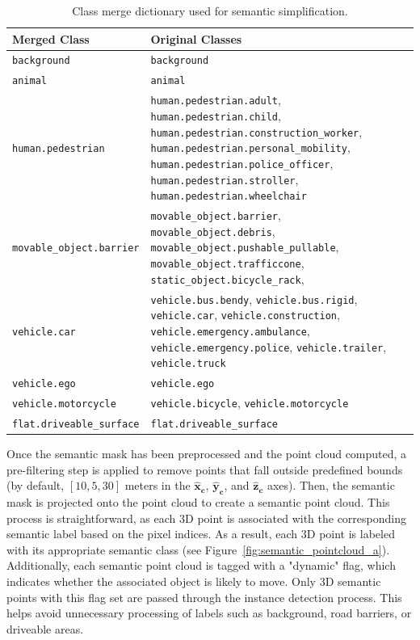 \begin{table}[h!]
    \centering
    \footnotesize
    \begin{tabular}{|l|p{10cm}|}
        \hline
        \textbf{Merged Class} & \textbf{Original Classes} \\
        \hline
        \texttt{background} & \texttt{background} \\ 
        \hline
        \texttt{animal} & \texttt{animal} \\
        \hline
        \texttt{human.pedestrian} &
        \texttt{human.pedestrian.adult}, \texttt{human.pedestrian.child}, \texttt{human.pedestrian.construction\_worker}, \texttt{human.pedestrian.personal\_mobility}, \texttt{human.pedestrian.police\_officer}, \texttt{human.pedestrian.stroller}, \texttt{human.pedestrian.wheelchair} \\
        \hline
        \texttt{movable\_object.barrier} &
        \texttt{movable\_object.barrier}, \texttt{movable\_object.debris}, \texttt{movable\_object.pushable\_pullable}, \texttt{movable\_object.trafficcone}, \texttt{static\_object.bicycle\_rack}, \\
        \hline
        \texttt{vehicle.car} & 
        \texttt{vehicle.bus.bendy}, \texttt{vehicle.bus.rigid}, \texttt{vehicle.car}, \texttt{vehicle.construction}, \texttt{vehicle.emergency.ambulance}, \texttt{vehicle.emergency.police}, \texttt{vehicle.trailer}, \texttt{vehicle.truck} \\
        \hline
        \texttt{vehicle.ego} & \texttt{vehicle.ego} \\
        \hline
        \texttt{vehicle.motorcycle} & 
        \texttt{vehicle.bicycle}, \texttt{vehicle.motorcycle} \\
        \hline
        \texttt{flat.driveable\_surface} & \texttt{flat.driveable\_surface} \\
        \hline
    \end{tabular}
    \caption{Class merge dictionary used for semantic simplification.}
    \label{tab:merge_dict}
\end{table}

Once the semantic mask has been preprocessed and the point cloud computed, a pre-filtering step is applied to remove points that fall outside predefined bounds (by default, $\left[10, 5, 30\right]$ meters in the $\mathbf{\hat{x}_c}$, $\mathbf{\hat{y}_c}$, and $\mathbf{\hat{z}_c}$ axes). Then, the semantic mask is projected onto the point cloud to create a semantic point cloud. This process is straightforward, as each 3D point is associated with the corresponding semantic label based on the pixel indices. As a result, each 3D point is labeled with its appropriate semantic class (see Figure~\ref{fig:semantic_pointcloud_a}). Additionally, each semantic point cloud is tagged with a "dynamic" flag, which indicates whether the associated object is likely to move. Only 3D semantic points with this flag set are passed through the instance detection process. This helps avoid unnecessary processing of labels such as background, road barriers, or driveable areas.

